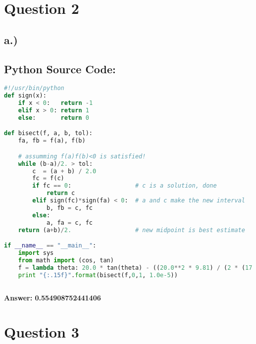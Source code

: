\documentclass{article}
\begin{document}
\pagebreak


\section*{Question 2}
\subsection*{a.)}
\subsection*{Python Source Code: }
\begin{lstlisting}[language=Python]
#!/usr/bin/python
def sign(x):
    if x < 0:	return -1
    elif x > 0: return 1
    else:		return 0

def bisect(f, a, b, tol):
    fa, fb = f(a), f(b)

    # assumming f(a)f(b)<0 is satisfied!
    while (b-a)/2. > tol:
        c  = (a + b) / 2.0
        fc = f(c)
        if fc == 0:                  # c is a solution, done
            return c
        elif sign(fc)*sign(fa) < 0:  # a and c make the new interval
            b, fb = c, fc
        else:
            a, fa = c, fc
    return (a+b)/2.                  # new midpoint is best estimate

if __name__ == "__main__":
    import sys
    from math import (cos, tan)
    f = lambda theta: 20.0 * tan(theta) - ((20.0**2 * 9.81) / (2 * (17.0**2) * cos(theta)**2)) - 3
    print "{:.15f}".format(bisect(f,0,1, 1.0e-5))
    
\end{lstlisting}

\begin{center}
  \textbf{ Answer: 0.554908752441406}
\end{center}


\pagebreak
\section*{Question 3}
\end{document}
